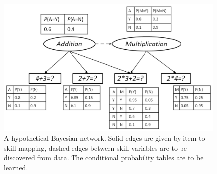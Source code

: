 \documentclass{edm_template}
\newcommand{\hl}[1]{\colorbox{yellow}{#1}}
\begin{document}

\begin{figure}
	\begin{center}
		\includegraphics[width=.90\linewidth]{figures/studentmodel.png}
	\end{center}
	\vspace{-0.5em}
	\caption{A hypothetical Bayesian network. %
		Solid edges are given by item to skill mapping, dashed edges between skill variables are to be discovered from data.
		The conditional probability tables are to be learned.}
	\label{fig:smexample}
	\vspace{-1em} 
\end{figure} 
\end{document}
